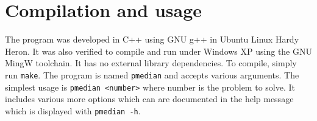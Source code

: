 \documentclass[11pt,letterpaper]{article}
\begin{document}
\section{Compilation and usage}
The program was developed in C++ using GNU g++ in Ubuntu Linux Hardy Heron. It was
also verified to compile and run under Windows XP using the GNU MingW toolchain. 
It has no external library dependencies. To compile, simply run {\tt make}.
The program is named {\tt pmedian} and accepts various arguments. The simplest
usage is {\tt pmedian <number>} where number is the problem to solve. It
includes various more options which can are documented in the help message
which is displayed with {\tt pmedian -h}.
\end{document}
